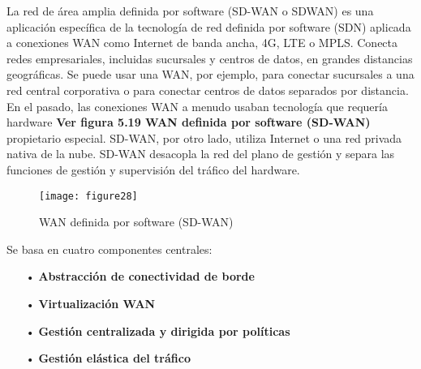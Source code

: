 La red de área amplia definida por software (SD-WAN o SDWAN) es una aplicación específica de la tecnología de red definida por software (SDN) aplicada a conexiones WAN como Internet de banda ancha, 4G, LTE o MPLS.
Conecta redes empresariales, incluidas sucursales y centros de datos, en grandes distancias geográficas. Se puede usar una WAN, por ejemplo, para conectar sucursales a una red central corporativa o para conectar centros de datos separados por distancia.
\\
En el pasado, las conexiones WAN a menudo usaban tecnología que requería hardware  \textbf{Ver figura 5.19 WAN definida por software (SD-WAN)} propietario especial. SD-WAN, por otro lado, utiliza Internet o una red privada nativa de la nube. SD-WAN desacopla la red del plano de gestión y separa las funciones de gestión y supervisión del tráfico del hardware. 
\begin{figure}[htbp]
  \centering
    {\texttt{[image: figure28]}}%
  \caption{WAN definida por software (SD-WAN)}
  \label{fig:fig2subfig}
\end{figure}

Se basa en cuatro componentes centrales:

\begin{itemize}
\item[•]\textbf{Abstracción de conectividad de borde}
\item[•]\textbf{Virtualización WAN}
\item[•]\textbf{Gestión centralizada y dirigida por políticas}
\item[•]\textbf{Gestión elástica del tráfico}
\end{itemize}